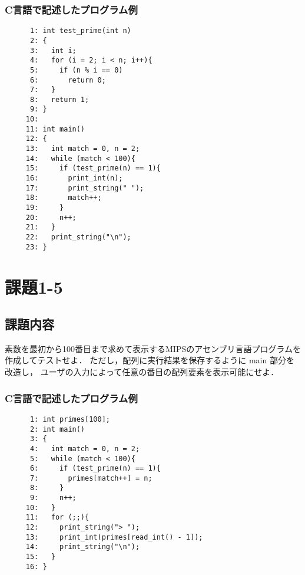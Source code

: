 \documentclass[a4j,11pt]{jarticle}
\begin{document}
\subsubsection{C言語で記述したプログラム例}

\begin{verbatim}
      1: int test_prime(int n)
      2: {
      3:   int i;
      4:   for (i = 2; i < n; i++){
      5:     if (n % i == 0)
      6:       return 0;
      7:   }
      8:   return 1;
      9: }
     10: 
     11: int main()
     12: {
     13:   int match = 0, n = 2;
     14:   while (match < 100){
     15:     if (test_prime(n) == 1){
     16:       print_int(n);
     17:       print_string(" ");
     18:       match++;
     19:     }
     20:     n++;
     21:   }
     22:   print_string("\n");
     23: }
\end{verbatim}

\section{課題1-5}

\subsection{課題内容}

素数を最初から100番目まで求めて表示するMIPSのアセンブリ言語プログラムを作成してテストせよ． 
ただし，配列に実行結果を保存するように main 部分を改造し， 
ユーザの入力によって任意の番目の配列要素を表示可能にせよ．

\subsubsection{C言語で記述したプログラム例}

\begin{verbatim}
      1: int primes[100];
      2: int main()
      3: {
      4:   int match = 0, n = 2;
      5:   while (match < 100){
      6:     if (test_prime(n) == 1){
      7:       primes[match++] = n;
      8:     }
      9:     n++;
     10:   }
     11:   for (;;){
     12:     print_string("> ");
     13:     print_int(primes[read_int() - 1]);
     14:     print_string("\n");
     15:   }
     16: }
\end{verbatim}

\end{document}
